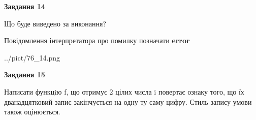 \documentclass[11pt, ukrainian]{article}
\begin{document}
{\begin {large}
{\begin {center}\textbf{Завдання 14}\end {center}}\par
Що буде виведено за виконання? \par
Повідомлення інтерпретатора про помилку позначати \textbf{error}

\begin{center}
	{../pict/76_14.png}
\end{center}
\newpage

{\begin {center}\textbf{Завдання 15}\end {center}}\par

Написати функцiю f, що отримує 2 цілих числа i повертає ознаку того, що їх дванадцятковий запис закінчується на одну ту саму цифру. Стиль запису умови також оцінюється.\par
\newpage

\end {large}}
\end{document}

